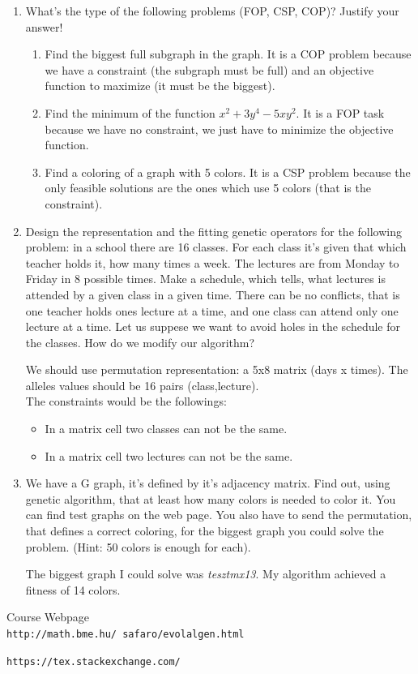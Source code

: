 \documentclass[12pt,english]{article}
\newenvironment{statement}{\fontfamily{ptm}\selectfont}{\par}
\begin{document}
\begin{enumerate}

	\item
		\begin{statement}
		What’s the type of the following problems (FOP, CSP, COP)? Justify your answer!
		\end{statement}
			\begin{enumerate}
				\item Find the biggest full subgraph in the graph. It is a COP problem because we have a constraint (the subgraph must be full) and an objective function to maximize (it must be the biggest).
				\item Find the minimum of the function $x^2 +3y^4 - 5xy^2$. It is a FOP task because we have no constraint, we just have to minimize the objective function.
				\item Find a coloring of a graph with 5 colors. It is a CSP problem because the only feasible solutions are the ones which use 5 colors (that is the constraint).
			\end{enumerate}

	\item
		\begin{statement}
		Design the representation and the fitting genetic operators for the following problem: in a school there are 16 classes. For each class it’s given that which teacher holds it, how many times a week. The lectures are from Monday to Friday in 8 possible times. Make a schedule, which tells, what lectures is attended by a given class in a given time. There can be no conflicts, that is one teacher holds ones lecture at a time, and one class can attend only one lecture at a time. Let us suppese we want to avoid holes in the schedule for the classes. How do we modify our algorithm?
		\end{statement}
		We should use permutation representation: a 5x8 matrix (days x times). The alleles values should be 16 pairs (class,lecture).\\
		The constraints would be the followings:
		\begin{itemize}
			\item In a matrix cell two classes can not be the same.
			\item In a matrix cell two lectures can not be the same.
		\end{itemize}


	\item
		\begin{statement}
		We have a G graph, it’s defined by it’s adjacency matrix. Find out, using genetic algorithm, that at least how many colors is needed to color it. You can find test graphs on the web page. You also have to send the permutation, that defines a correct coloring, for the biggest graph you could solve the problem. (Hint: 50 colors is enough for each).
		\end{statement}
		The biggest graph I could solve was \emph{tesztmx13}. My algorithm achieved a fitness of 14 colors.


\end{enumerate}


\begin{thebibliography}{9}

Course Webpage
\\\texttt{http://math.bme.hu/~safaro/evolalgen.html}


\texttt{https://tex.stackexchange.com/}


\end{thebibliography}
\end{document}
